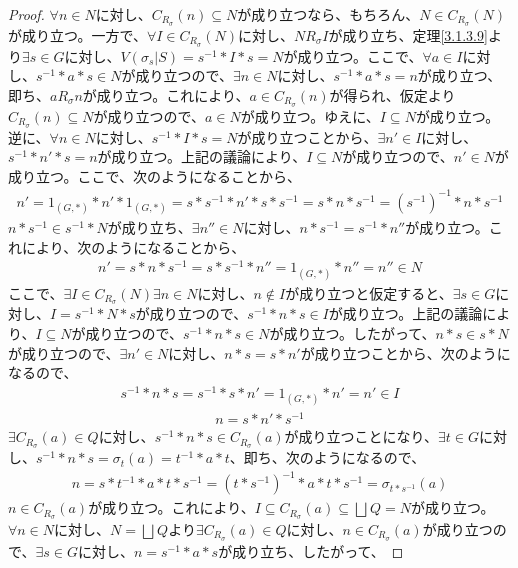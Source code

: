 \documentclass[dvipdfmx]{jsarticle}
\begin{document}
\begin{proof}
$\forall n \in N$に対し、$C_{R_{\sigma}}(n) \subseteq N$が成り立つなら、もちろん、$N \in C_{R_{\sigma}}(N)$が成り立つ。一方で、$\forall I \in C_{R_{\sigma}}(N)$に対し、$NR_{\sigma}I$が成り立ち、定理\ref{3.1.3.9}より$\exists s \in G$に対し、$V\left( \sigma_{s}|S \right) = s^{- 1}*I*s = N$が成り立つ。ここで、$\forall a \in I$に対し、$s^{- 1}*a*s \in N$が成り立つので、$\exists n \in N$に対し、$s^{- 1}*a*s = n$が成り立つ、即ち、$aR_{\sigma}n$が成り立つ。これにより、$a \in C_{R_{\sigma}}(n)$が得られ、仮定より$C_{R_{\sigma}}(n) \subseteq N$が成り立つので、$a \in N$が成り立つ。ゆえに、$I \subseteq N$が成り立つ。逆に、$\forall n \in N$に対し、$s^{- 1}*I*s = N$が成り立つことから、$\exists n' \in I$に対し、$s^{- 1}*n'*s = n$が成り立つ。上記の議論により、$I \subseteq N$が成り立つので、$n' \in N$が成り立つ。ここで、次のようになることから、
\begin{align*}
n' = 1_{(G,*)}*n'*1_{(G,*)} = s*s^{- 1}*n'*s*s^{- 1} = s*n*s^{- 1} = \left( s^{- 1} \right)^{- 1}*n*s^{- 1}
\end{align*}
$n*s^{- 1} \in s^{- 1}*N$が成り立ち、$\exists n'' \in N$に対し、$n*s^{- 1} = s^{- 1}*n''$が成り立つ。これにより、次のようになることから、
\begin{align*}
n' = s*n*s^{- 1} = s*s^{- 1}*n'' = 1_{(G,*)}*n'' = n'' \in N
\end{align*}
ここで、$\exists I \in C_{R_{\sigma}}(N)\exists n \in N$に対し、$n \notin I$が成り立つと仮定すると、$\exists s \in G$に対し、$I = s^{- 1}*N*s$が成り立つので、$s^{- 1}*n*s \in I$が成り立つ。上記の議論により、$I \subseteq N$が成り立つので、$s^{- 1}*n*s \in N$が成り立つ。したがって、$n*s \in s*N$が成り立つので、$\exists n' \in N$に対し、$n*s = s*n'$が成り立つことから、次のようになるので、
\begin{align*}
s^{- 1}*n*s = s^{- 1}*s*n' = 1_{(G,*)}*n' = n' \in I
\end{align*}
\begin{align*}
n = s*n'*s^{- 1}
\end{align*}
$\exists C_{R_{\sigma}}(a) \in Q$に対し、$s^{- 1}*n*s \in C_{R_{\sigma}}(a)$が成り立つことになり、$\exists t \in G$に対し、$s^{- 1}*n*s = \sigma_{t}(a) = t^{- 1}*a*t$、即ち、次のようになるので、
\begin{align*}
n = s*t^{- 1}*a*t*s^{- 1} = \left( t*s^{- 1} \right)^{- 1}*a*t*s^{- 1} = \sigma_{t*s^{- 1}}(a)
\end{align*}
$n \in C_{R_{\sigma}}(a)$が成り立つ。これにより、$I \subseteq C_{R_{\sigma}}(a) \subseteq \bigsqcup_{} Q = N$が成り立つ。$\forall n \in N$に対し、$N = \bigsqcup_{} Q$より$\exists C_{R_{\sigma}}(a) \in Q$に対し、$n \in C_{R_{\sigma}}(a)$が成り立つので、$\exists s \in G$に対し、$n = s^{- 1}*a*s$が成り立ち、したがって、

\end{proof}
\end{document}
